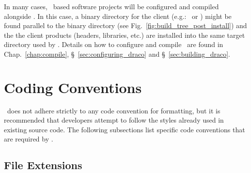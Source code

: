 
In many cases, \draco\ based software projects will be configured and compiled alongside \draco.  In this case, a binary directory for the client (e.g.: \clubimc\ or \capsaicin) might be found parallel to the  binary directory (see Fig.~\ref{fig:build_tree_post_install}) and the the client products (headers, libraries, etc.) are installed into the same target directory used by \draco.  Details on how to configure and compile \draco\ are found in Chap.~\ref{chap:compile}, \S~\ref{sec:configuring_draco} and \S~\ref{sec:building_draco}.



\section{Coding Conventions}
\label{sec:codeconventions} 

\draco\ does not adhere strictly to any code convention for formatting, but it is recommended that developers attempt to follow the styles already used in existing source code.  The following subsections list specific code conventions that are required by \draco.

\subsection{File Extensions}
\label{sec:cc-fileext}

